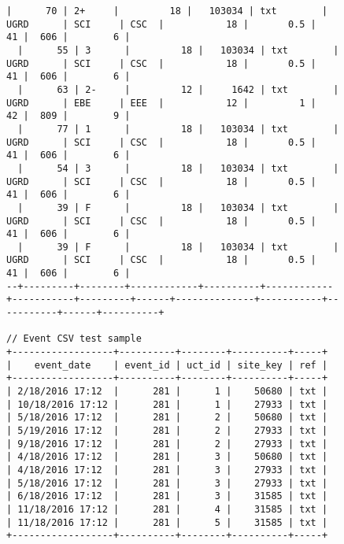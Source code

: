 \begin{figure}[H]
\begin{mdframed}[rightline=false,leftline=false]
\begin{BVerbatim}[fontsize=\tiny]
  |      70 | 2+     |         18 |   103034 | txt        | UGRD      | SCI     | CSC  |           18 |       0.5 |        41 |  606 |        6 |
  |      55 | 3      |         18 |   103034 | txt        | UGRD      | SCI     | CSC  |           18 |       0.5 |        41 |  606 |        6 |
  |      63 | 2-     |         12 |     1642 | txt        | UGRD      | EBE     | EEE  |           12 |         1 |        42 |  809 |        9 |
  |      77 | 1      |         18 |   103034 | txt        | UGRD      | SCI     | CSC  |           18 |       0.5 |        41 |  606 |        6 |
  |      54 | 3      |         18 |   103034 | txt        | UGRD      | SCI     | CSC  |           18 |       0.5 |        41 |  606 |        6 |
  |      39 | F      |         18 |   103034 | txt        | UGRD      | SCI     | CSC  |           18 |       0.5 |        41 |  606 |        6 |
  |      39 | F      |         18 |   103034 | txt        | UGRD      | SCI     | CSC  |           18 |       0.5 |        41 |  606 |        6 |
--+---------+--------+------------+----------+------------+-----------+---------+------+--------------+-----------+-----------+------+----------+

// Event CSV test sample
+------------------+----------+--------+----------+-----+
|    event_date    | event_id | uct_id | site_key | ref |
+------------------+----------+--------+----------+-----+
| 2/18/2016 17:12  |      281 |      1 |    50680 | txt |
| 10/18/2016 17:12 |      281 |      1 |    27933 | txt |
| 5/18/2016 17:12  |      281 |      2 |    50680 | txt |
| 5/19/2016 17:12  |      281 |      2 |    27933 | txt |
| 9/18/2016 17:12  |      281 |      2 |    27933 | txt |
| 4/18/2016 17:12  |      281 |      3 |    50680 | txt |
| 4/18/2016 17:12  |      281 |      3 |    27933 | txt |
| 5/18/2016 17:12  |      281 |      3 |    27933 | txt |
| 6/18/2016 17:12  |      281 |      3 |    31585 | txt |
| 11/18/2016 17:12 |      281 |      4 |    31585 | txt |
| 11/18/2016 17:12 |      281 |      5 |    31585 | txt |
+------------------+----------+--------+----------+-----+


\end{BVerbatim}
\end{mdframed}
\end{figure}
